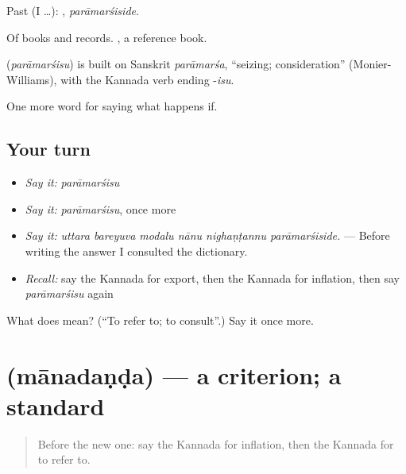 Past (I …): , \emph{parāmarśiside}.

Of books and records.  , a reference book.

\begin{cousinweb}
\textbf{} (\emph{parāmarśisu}) is built on Sanskrit \emph{parāmarśa}, \textquotedblleft{}seizing; consideration\textquotedblright{} (Monier-Williams), with the Kannada verb ending -\emph{isu}.
\end{cousinweb}

\begin{grammarlens}[title={What you've built}]
One more word for saying what happens if.
\end{grammarlens}

\subsection*{Your turn}
\begin{itemize}
\raggedright
  \item \emph{Say it:} \emph{parāmarśisu}
  \item \emph{Say it:} \emph{parāmarśisu}, once more
  \item \emph{Say it:} \emph{uttara bareyuva modalu nānu nighaṇṭannu parāmarśiside.} — Before writing the answer I consulted the dictionary.
  \item \emph{Recall:} say the Kannada for export, then the Kannada for inflation, then say \emph{parāmarśisu} again
\end{itemize}

\begin{tcolorbox}[breakable,colback=teal!4,colframe=teal!35!black,title={Before you move on}]
What does  mean? (\textquotedblleft{}To refer to; to consult\textquotedblright{}.) Say it once more.
\end{tcolorbox}
\section[\texorpdfstring{\kn{ಮಾನದಂಡ} (mānadaṇḍa)}{ಮಾನದಂಡ (mānadaṇḍa)}]{ (mānadaṇḍa) — a criterion; a standard}

\label{lesson:KA-C422-manadanda}



\begin{quote}
Before the new one: say the Kannada for inflation, then the Kannada for to refer to.
\end{quote}

